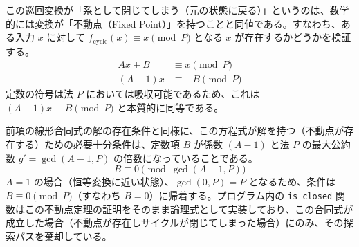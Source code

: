\documentclass{jsarticle}
\begin{document}
この巡回変換が「系として閉じてしまう（元の状態に戻る）」というのは、数学的には変換が「不動点（Fixed Point）」を持つことと同値である。すなわち、ある入力 $x$ に対して $f_{\text{cycle}}(x) \equiv x \pmod P$ となる $x$ が存在するかどうかを検証する。
\begin{align*}
A x + B &\equiv x \pmod P \\
(A - 1)x &\equiv -B \pmod P
\end{align*}
定数の符号は法 $P$ においては吸収可能であるため、これは $(A - 1)x \equiv B \pmod P$ と本質的に同等である。

前項の線形合同式の解の存在条件と同様に、この方程式が解を持つ（不動点が存在する）ための必要十分条件は、定数項 $B$ が係数 $(A - 1)$ と法 $P$ の最大公約数 $g' = \gcd(A - 1, P)$ の倍数になっていることである。
\[
B \equiv 0 \pmod{\gcd(A - 1, P)}
\]
$A = 1$ の場合（恒等変換に近い状態）、$\gcd(0, P) = P$ となるため、条件は $B \equiv 0 \pmod P$（すなわち $B = 0$）に帰着する。プログラム内の \texttt{is\_closed} 関数はこの不動点定理の証明をそのまま論理式として実装しており、この合同式が成立した場合（不動点が存在しサイクルが閉じてしまった場合）にのみ、その探索パスを棄却している。
\end{document}
